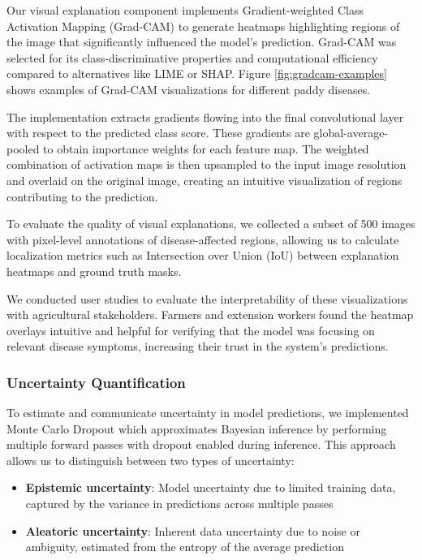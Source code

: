 Our visual explanation component implements Gradient-weighted Class Activation Mapping (Grad-CAM) \cite{selvaraju2017grad} to generate heatmaps highlighting regions of the image that significantly influenced the model's prediction. Grad-CAM was selected for its class-discriminative properties and computational efficiency compared to alternatives like LIME or SHAP. Figure \ref{fig:gradcam-examples} shows examples of Grad-CAM visualizations for different paddy diseases.

The implementation extracts gradients flowing into the final convolutional layer with respect to the predicted class score. These gradients are global-average-pooled to obtain importance weights for each feature map. The weighted combination of activation maps is then upsampled to the input image resolution and overlaid on the original image, creating an intuitive visualization of regions contributing to the prediction.

To evaluate the quality of visual explanations, we collected a subset of 500 images with pixel-level annotations of disease-affected regions, allowing us to calculate localization metrics such as Intersection over Union (IoU) between explanation heatmaps and ground truth masks.

We conducted user studies to evaluate the interpretability of these visualizations with agricultural stakeholders. Farmers and extension workers found the heatmap overlays intuitive and helpful for verifying that the model was focusing on relevant disease symptoms, increasing their trust in the system's predictions.


\subsubsection{Uncertainty Quantification}

To estimate and communicate uncertainty in model predictions, we implemented Monte Carlo Dropout \cite{gal2016dropout} which approximates Bayesian inference by performing multiple forward passes with dropout enabled during inference. This approach allows us to distinguish between two types of uncertainty:

\begin{itemize}
    \item \textbf{Epistemic uncertainty}: Model uncertainty due to limited training data, captured by the variance in predictions across multiple passes
    \item \textbf{Aleatoric uncertainty}: Inherent data uncertainty due to noise or ambiguity, estimated from the entropy of the average prediction
\end{itemize}

